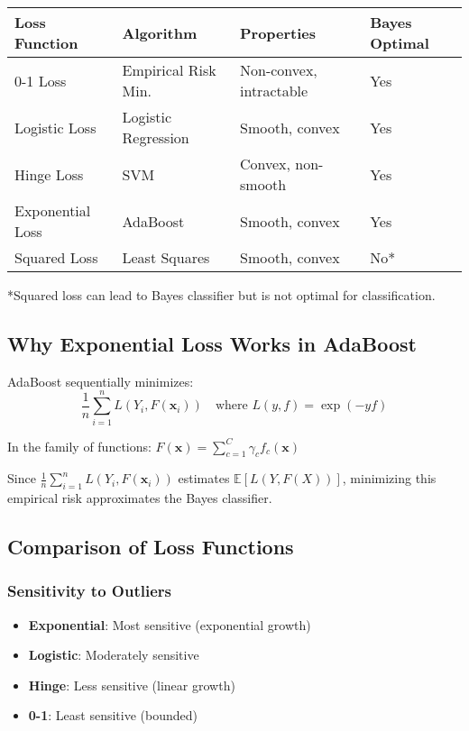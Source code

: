\documentclass[12pt,a4paper]{article}
\begin{document}
\begin{table}[h]
\centering
\begin{tabular}{|l|l|l|l|}
\hline
\textbf{Loss Function} & \textbf{Algorithm} & \textbf{Properties} & \textbf{Bayes Optimal} \\
\hline
0-1 Loss & Empirical Risk Min. & Non-convex, intractable & Yes \\
\hline
Logistic Loss & Logistic Regression & Smooth, convex & Yes \\
\hline
Hinge Loss & SVM & Convex, non-smooth & Yes \\
\hline
Exponential Loss & AdaBoost & Smooth, convex & Yes \\
\hline
Squared Loss & Least Squares & Smooth, convex & No* \\
\hline
\end{tabular}
\end{table}

*Squared loss can lead to Bayes classifier but is not optimal for classification.

\subsection{Why Exponential Loss Works in AdaBoost}

\begin{tcolorbox}[colback=green!5!white,colframe=green!75!black,title=AdaBoost Connection]
AdaBoost sequentially minimizes:
$$\frac{1}{n}\sum_{i=1}^n L(Y_i, F(\mathbf{x}_i)) \quad \text{where } L(y,f) = \exp(-yf)$$

In the family of functions: $F(\mathbf{x}) = \sum_{c=1}^C \gamma_c f_c(\mathbf{x})$

Since $\frac{1}{n}\sum_{i=1}^n L(Y_i, F(\mathbf{x}_i))$ estimates $\mathbb{E}[L(Y, F(X))]$, minimizing this empirical risk approximates the Bayes classifier.
\end{tcolorbox}

\subsection{Comparison of Loss Functions}

\subsubsection{Sensitivity to Outliers}
\begin{itemize}
    \item \textbf{Exponential}: Most sensitive (exponential growth)
    \item \textbf{Logistic}: Moderately sensitive 
    \item \textbf{Hinge}: Less sensitive (linear growth)
    \item \textbf{0-1}: Least sensitive (bounded)
\end{itemize}
\end{document}
